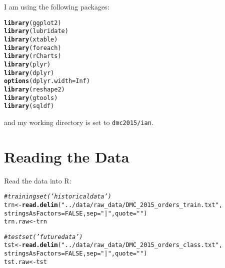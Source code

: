 \documentclass[10pt]{report}
\makeatletter
\newcommand{\hlnum}[1]{\textcolor[rgb]{0.686,0.059,0.569}{#1}}%
\newcommand{\hlstr}[1]{\textcolor[rgb]{0.192,0.494,0.8}{#1}}%
\newcommand{\hlcom}[1]{\textcolor[rgb]{0.678,0.584,0.686}{\textit{#1}}}%
\newcommand{\hlstd}[1]{\textcolor[rgb]{0.345,0.345,0.345}{#1}}%
\newcommand{\hlkwb}[1]{\textcolor[rgb]{0.69,0.353,0.396}{#1}}%
\newcommand{\hlkwc}[1]{\textcolor[rgb]{0.333,0.667,0.333}{#1}}%
\newcommand{\hlkwd}[1]{\textcolor[rgb]{0.737,0.353,0.396}{\textbf{#1}}}%
\newenvironment{kframe}{%
 \def\at@end@of@kframe{}%
 \ifinner\ifhmode%
  \def\at@end@of@kframe{\end{minipage}}%
  \begin{minipage}{\columnwidth}%
 \fi\fi%
 \def\FrameCommand##1{\hskip\@totalleftmargin \hskip-\fboxsep
 \colorbox{shadecolor}{##1}\hskip-\fboxsep
     \hskip-\linewidth \hskip-\@totalleftmargin \hskip\columnwidth}%
 \MakeFramed {\advance\hsize-\width
   \@totalleftmargin\z@ \linewidth\hsize
   \@setminipage}}%
 {\par\unskip\endMakeFramed%
 \at@end@of@kframe}
\newenvironment{knitrout}{}{} %
\makeatother
\begin{document}
%


\titleheader

I am using the following packages:
\begin{knitrout}
\color{fgcolor}\begin{kframe}
\begin{alltt}
\hlkwd{library}\hlstd{(ggplot2)}
\hlkwd{library}\hlstd{(lubridate)}
\hlkwd{library}\hlstd{(xtable)}
\hlkwd{library}\hlstd{(foreach)}
\hlkwd{library}\hlstd{(rCharts)}
\hlkwd{library}\hlstd{(plyr)}
\hlkwd{library}\hlstd{(dplyr)}
\hlkwd{options}\hlstd{(}\hlkwc{dplyr.width} \hlstd{=} \hlnum{Inf}\hlstd{)}
\hlkwd{library}\hlstd{(reshape2)}
\hlkwd{library}\hlstd{(gtools)}
\hlkwd{library}\hlstd{(sqldf)}
\end{alltt}
\end{kframe}
\end{knitrout}
and my working directory is set to \verb!dmc2015/ian!.

\section{Reading the Data}
Read the data into R:
\begin{knitrout}
\color{fgcolor}\begin{kframe}
\begin{alltt}
\hlcom{# training set ('historical data')}
\hlstd{trn} \hlkwb{<-} \hlkwd{read.delim}\hlstd{(}\hlstr{"../data/raw_data/DMC_2015_orders_train.txt"}\hlstd{,}
    \hlkwc{stringsAsFactors} \hlstd{=} \hlnum{FALSE}\hlstd{,} \hlkwc{sep} \hlstd{=} \hlstr{"|"}\hlstd{,} \hlkwc{quote} \hlstd{=} \hlstr{""}\hlstd{)}
\hlstd{trn.raw} \hlkwb{<-} \hlstd{trn}

\hlcom{# test set ('future data')}
\hlstd{tst} \hlkwb{<-} \hlkwd{read.delim}\hlstd{(}\hlstr{"../data/raw_data/DMC_2015_orders_class.txt"}\hlstd{,}
    \hlkwc{stringsAsFactors} \hlstd{=} \hlnum{FALSE}\hlstd{,} \hlkwc{sep} \hlstd{=} \hlstr{"|"}\hlstd{,} \hlkwc{quote} \hlstd{=} \hlstr{""}\hlstd{)}
\hlstd{tst.raw} \hlkwb{<-} \hlstd{tst}
\end{alltt}
\end{kframe}
\end{knitrout}
\end{document}
